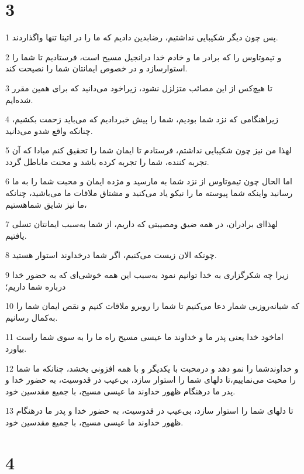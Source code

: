 \chapter{3}

\par 1 پس چون دیگر شکیبایی نداشتیم، رضابدین دادیم که ما را در اتینا تنها واگذاردند.
\par 2 و تیموتاوس را که برادر ما و خادم خدا درانجیل مسیح است، فرستادیم تا شما را استوارسازد و در خصوص ایمانتان شما را نصیحت کند.
\par 3 تا هیچ‌کس از این مصائب متزلزل نشود، زیراخود می‌دانید که برای همین مقرر شده‌ایم.
\par 4 زیراهنگامی که نزد شما بودیم، شما را پیش خبردادیم که می‌باید زحمت بکشیم، چنانکه واقع شدو می‌دانید.
\par 5 لهذا من نیز چون شکیبایی نداشتم، فرستادم تا ایمان شما را تحقیق کنم مبادا که آن تجربه کننده، شما را تجربه کرده باشد و محنت ماباطل گردد.
\par 6 اما الحال چون تیموتاوس از نزد شما به مارسید و مژده ایمان و محبت شما را به ما رسانید واینکه شما پیوسته ما را نیکو یاد می‌کنید و مشتاق ملاقات ما می‌باشید، چنانکه ما نیز شایق شماهستیم،
\par 7 لهذا‌ای برادران، در همه ضیق ومصیبتی که داریم، از شما به‌سبب ایمانتان تسلی یافتیم.
\par 8 چونکه الان زیست می‌کنیم، اگر شما درخداوند استوار هستید.
\par 9 زیرا چه شکرگزاری به خدا توانیم نمود به‌سبب این همه خوشی‌ای که به حضور خدا درباره شما داریم؛
\par 10 که شبانه‌روزبی شمار دعا می‌کنیم تا شما را روبرو ملاقات کنیم و نقص ایمان شما را به‌کمال رسانیم.
\par 11 اماخود خدا یعنی پدر ما و خداوند ما عیسی مسیح راه ما را به سوی شما راست بیاورد.
\par 12 و خداوندشما را نمو دهد و درمحبت با یکدیگر و با همه افزونی بخشد، چنانکه ما شما را محبت می‌نماییم،تا دلهای شما را استوار سازد، بی‌عیب در قدوسیت، به حضور خدا و پدر ما درهنگام ظهور خداوند ما عیسی مسیح، با جمیع مقدسین خود.
\par 13 تا دلهای شما را استوار سازد، بی‌عیب در قدوسیت، به حضور خدا و پدر ما درهنگام ظهور خداوند ما عیسی مسیح، با جمیع مقدسین خود.

\chapter{4}


